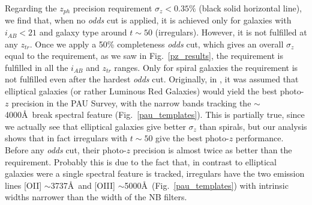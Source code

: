 Regarding the $z_{ph}$ precision requirement $\sigma_z < 0.35\%$ (black solid horizontal line), we find that, when no \textit{odds} cut is applied, it is achieved only for galaxies with $i_{AB}<21$ and galaxy type around $t\sim50$ (irregulars). However, it is not fulfilled at any $z_{tr}$. Once we apply a 50\% completeness \textit{odds} cut, which gives an overall $\sigma_z$ equal to the requirement, as we saw in Fig.~\ref{pz_results}, the requirement is fulfilled in all the $i_{AB}$ and $z_{tr}$ ranges. Only for spiral galaxies the requirement is not fulfilled even after the hardest \textit{odds} cut. Originally, in \citet{Benitez2009}, it was assumed that elliptical galaxies (or rather Luminous Red Galaxies) would yield the best photo-$z$ precision in the PAU Survey, with the narrow bands tracking the $\sim$4000\AA \ break spectral feature (Fig.~\ref{pau_templates}). This is partially true, since we actually see that elliptical galaxies give better $\sigma_z$ than spirals, but our analysis shows that in fact irregulars with $t\sim50$ give the best photo-$z$ performance. Before any \textit{odds} cut, their photo-$z$ precision is almost twice as better than the requirement. Probably this is due to the fact that, in contrast to elliptical galaxies were a single spectral feature is tracked, irregulars have the two emission lines [OII] $\sim$3737\AA \ and [OIII] $\sim$5000\AA \ (Fig.~\ref{pau_templates}) with intrinsic widths narrower than the width of the NB filters.

